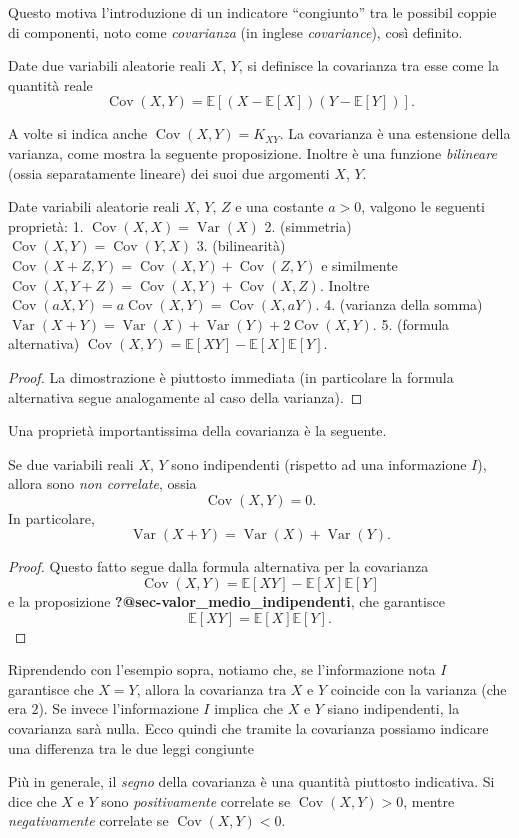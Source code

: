 \documentclass[
  italian,
  letterpaper,
]{book}
\newcommand{\bra}[1]{\left( #1 \right)}
\newcommand{\sqa}[1]{\left[ #1 \right]}
\newcommand{\E}[1]{\mathbb{E}\sqa{#1}}
\newcommand{\Var}[1]{\operatorname{Var}\bra{#1}}
\newcommand{\Cov}[1]{\operatorname{Cov}\bra{#1}}
\theoremstyle{definition}
\theoremstyle{remark}
\begin{document}
Questo motiva l'introduzione di un indicatore ``congiunto'' tra le
possibil coppie di componenti, noto come \emph{covarianza} (in inglese
\emph{covariance}), così definito.

Date due variabili aleatorie reali \(X\), \(Y\), si definisce la
covarianza tra esse come la quantità reale
\[ \Cov{X,Y} = \E {(X-\E{X})(Y-\E{Y})}.\]

A volte si indica anche \(\Cov{X,Y} = K_{XY}\). La covarianza è una
estensione della varianza, come mostra la seguente proposizione. Inoltre
è una funzione \emph{bilineare} (ossia separatamente lineare) dei suoi
due argomenti \(X\), \(Y\).

Date variabili aleatorie reali \(X\), \(Y\), \(Z\) e una costante
\(a>0\), valgono le seguenti proprietà: 1. \(\Cov{X, X} = \Var{X}\) 2.
(simmetria) \(\Cov{X,Y} = \Cov{Y,X}\) 3. (bilinearità)
\(\Cov{X+Z, Y} = \Cov{X,Y} + \Cov{Z, Y}\) e similmente
\(\Cov{X, Y+Z} = \Cov{X,Y} + \Cov{X,Z}\). Inoltre
\(\Cov{aX, Y} = a \Cov{X,Y} = \Cov{X, aY}\). 4. (varianza della somma)
\(\Var{X+Y} = \Var{X}+ \Var{Y}+ 2\Cov{X,Y}\). 5. (formula alternativa)
\(\Cov{X,Y} = \E{XY} - \E{X}\E{Y}\).

\begin{proof}
La dimostrazione è piuttosto immediata (in particolare la formula
alternativa segue analogamente al caso della varianza).
\end{proof}

Una proprietà importantissima della covarianza è la seguente.

Se due variabili reali \(X\), \(Y\) sono indipendenti (rispetto ad una
informazione \(I\)), allora sono \emph{non correlate}, ossia
\[ \Cov{X,Y }  = 0.\] In particolare, \[\Var{X+Y} = \Var{X} +\Var{Y}.\]

\begin{proof}
Questo fatto segue dalla formula alternativa per la covarianza
\[ \Cov{X,Y} = \E{XY} - \E{X}\E{Y}\] e la proposizione
\textbf{?@sec-valor\_medio\_indipendenti}, che garantisce
\[ \E{XY} = \E{X}\E{Y}.\]
\end{proof}

Riprendendo con l'esempio sopra, notiamo che, se l'informazione nota
\(I\) garantisce che \(X=Y\), allora la covarianza tra \(X\) e \(Y\)
coincide con la varianza (che era \(2\)). Se invece l'informazione \(I\)
implica che \(X\) e \(Y\) siano indipendenti, la covarianza sarà nulla.
Ecco quindi che tramite la covarianza possiamo indicare una differenza
tra le due leggi congiunte

Più in generale, il \emph{segno} della covarianza è una quantità
piuttosto indicativa. Si dice che \(X\) e \(Y\) sono
\emph{positivamente} correlate se \(\Cov{X,Y} >0\), mentre
\emph{negativamente} correlate se \(\Cov{X,Y}<0\).
\end{document}
